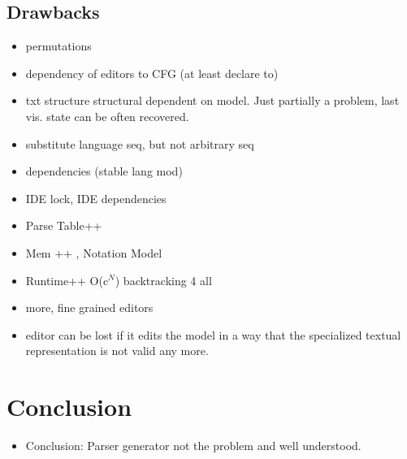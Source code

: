 \subsection{Drawbacks}
\begin{itemize}
	\item permutations
	\item dependency of editors to CFG (at least declare to)
	\item txt structure structural dependent on model. Just partially a problem, last vis. state can be often recovered.
	\item substitute language seq, but not arbitrary seq
	\item dependencies (stable lang mod)
	\item IDE lock, IDE dependencies
	\item Parse Table++
	\item Mem ++ , Notation Model
	\item Runtime++ O(c$^N$) backtracking 4 all
	\item more, fine grained editors
	\item editor can be lost if it edits the model in a way that the specialized textual representation is not valid any more.
\end{itemize}


\section{Conclusion}
\begin{itemize}
	\item Conclusion: Parser generator not the problem and well understood.
\end{itemize}	